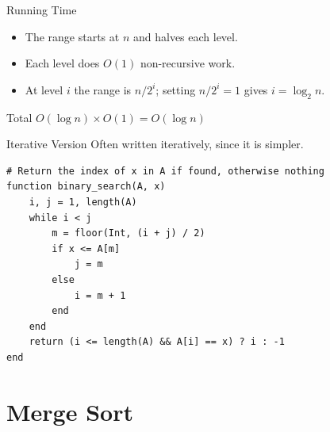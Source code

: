\documentclass[10pt,aspectratio=169]{beamer}
\begin{document}
\begin{frame}{Running Time}
  \begin{itemize}
    \item The range starts at $n$ and halves each level.
    \item Each level does $O(1)$ non-recursive work.
    \item At level $i$ the range is $n/2^i$; setting $n/2^i = 1$ gives $i = \log_2 n$.
  \end{itemize}

  \bigskip
  \begin{center}
  \end{center}

  \bigskip
  \begin{alertblock}{Total}
    $O(\log n) \times O(1) = O(\log n)$
  \end{alertblock}
\end{frame}

\begin{frame}[fragile]{Iterative Version}
  Often written iteratively, since it is simpler.

  \begin{lstlisting}
# Return the index of x in A if found, otherwise nothing
function binary_search(A, x)
    i, j = 1, length(A)
    while i < j
        m = floor(Int, (i + j) / 2)
        if x <= A[m]
            j = m
        else
            i = m + 1
        end
    end
    return (i <= length(A) && A[i] == x) ? i : -1
end
  \end{lstlisting}
\end{frame}

\section{Merge Sort}
\end{document}
